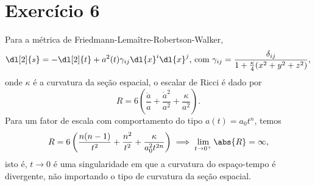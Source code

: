 \section*{Exercício 6}
Para a métrica de Friedmann-Lemaître-Robertson-Walker,
\begin{equation*}
    \dl[2]{s} = -\dl[2]{t} + a^2(t) \gamma_{ij} \dl{x}^i\dl{x}^j\text{, com }\gamma_{ij} = \frac{\delta_{ij}}{1 + \frac{\kappa}4(x^2 + y^2 + z^2)},
\end{equation*}
onde \(\kappa\) é a curvatura da seção espacial, o escalar de Ricci é dado por
\begin{equation*}
    R = 6\left(\frac{\ddot{a}}{a} + \frac{\dot{a}^2}{a^2} + \frac{\kappa}{a^2}\right).
\end{equation*}
Para um fator de escala com comportamento do tipo \(a(t) = a_0t^n\), temos
\begin{equation*}
    R = 6 \left(\frac{n(n-1)}{t^2} + \frac{n^2}{t^2} + \frac{\kappa}{a_0^2t^{2n}}\right) \implies \lim_{t \to 0^+} \abs{R} = \infty,
\end{equation*}
isto é, \(t \to 0\) é uma singularidade em que a curvatura do espaço-tempo é divergente, não importando o tipo de curvatura da seção espacial.
